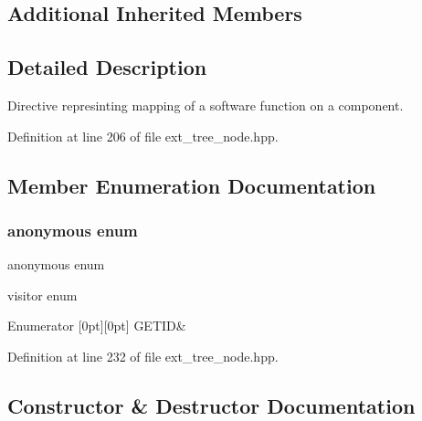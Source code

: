 \subsection*{Additional Inherited Members}


\subsection{Detailed Description}
Directive represinting mapping of a software function on a component. 

Definition at line 206 of file ext\+\_\+tree\+\_\+node.\+hpp.



\subsection{Member Enumeration Documentation}
\mbox{\label{structcall__hw__pragma_ae4af9d5c3a7b842647e704eb6ce1c975}} 
\subsubsection{\texorpdfstring{anonymous enum}{anonymous enum}}
{\footnotesize\ttfamily anonymous enum}



visitor enum 

\begin{DoxyEnumFields}{Enumerator}
[0pt][0pt]{}\mbox{\label{structcall__hw__pragma_ae4af9d5c3a7b842647e704eb6ce1c975a1f6b88f0f5294c33a0fa20333fd9d101}} 
G\+E\+T\+ID&\\
\hline

\end{DoxyEnumFields}


Definition at line 232 of file ext\+\_\+tree\+\_\+node.\+hpp.



\subsection{Constructor \& Destructor Documentation}
\mbox{\label{structcall__hw__pragma_aed96e36650fe30408ca38cc1d1bde892}} 
